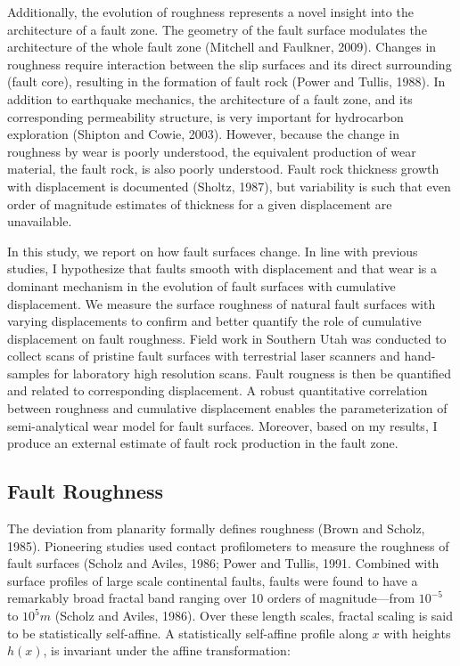 \documentclass[12pt,a4paper]{article}
\begin{document}
Additionally, the evolution of roughness represents a novel insight into the architecture of a fault zone.  The geometry of the fault surface modulates the architecture of the whole fault zone (Mitchell and Faulkner, 2009). Changes in roughness require interaction between the slip surfaces and its direct surrounding (fault core), resulting in the formation of fault rock (Power and Tullis, 1988). In addition to earthquake mechanics, the architecture of a fault zone, and its corresponding permeability structure, is very important for hydrocarbon exploration (Shipton and Cowie, 2003). However, because the change in roughness by wear is poorly understood, the equivalent production of wear material, the fault rock, is also poorly understood. Fault rock thickness growth with displacement is documented (Sholtz, 1987), but variability is such that even order of magnitude estimates of thickness for a given displacement are unavailable.

	In this study, we report on how fault surfaces change. In line with previous studies, I hypothesize that faults smooth with displacement and that wear is a dominant mechanism in the evolution of fault surfaces with cumulative displacement. We measure the surface roughness of natural fault surfaces with varying displacements to confirm and better quantify the role of cumulative displacement on fault roughness. Field work in Southern Utah was conducted to collect scans of pristine fault  surfaces with terrestrial laser scanners and hand-samples for laboratory high resolution scans. Fault rougness is then be quantified and related to corresponding displacement. A robust quantitative correlation between roughness and cumulative displacement enables the parameterization of semi-analytical wear model for fault surfaces. Moreover, based on my results, I produce an external estimate of fault rock production in the fault zone. 


\subsection{Fault Roughness}

The deviation from planarity formally defines roughness (Brown and Scholz, 1985). Pioneering studies used contact profilometers to measure the roughness of fault surfaces (Scholz and Aviles, 1986; Power and Tullis, 1991. Combined with surface profiles of large scale continental faults, faults were found to have a remarkably broad fractal band ranging over 10 orders of magnitude—from $10^{-5}$ to $10^5 m$ (Scholz and Aviles, 1986). Over these length scales, fractal scaling is said to be statistically self-affine. 	
A statistically self-affine profile along $x$ with heights $h(x)$, is invariant under the affine transformation:
\end{document}
